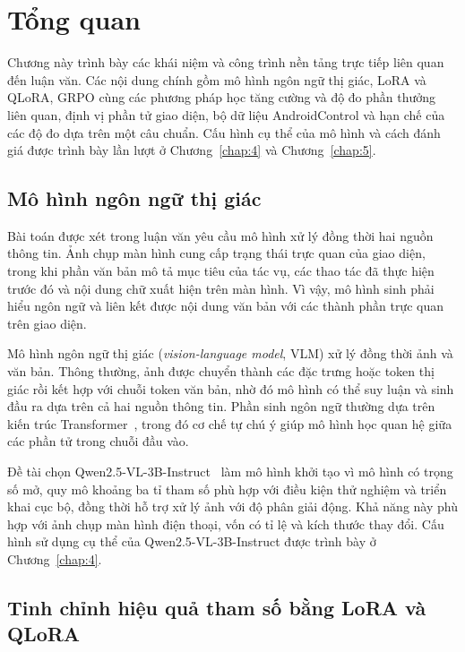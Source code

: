 \chapter{Tổng quan}
\label{chap:2}

Chương này trình bày các khái niệm và công trình nền tảng trực tiếp liên quan đến luận văn. Các nội dung chính gồm mô hình ngôn ngữ thị giác, LoRA và QLoRA, GRPO cùng các phương pháp học tăng cường và độ đo phần thưởng liên quan, định vị phần tử giao diện, bộ dữ liệu AndroidControl và hạn chế của các độ đo dựa trên một câu chuẩn. Cấu hình cụ thể của mô hình và cách đánh giá được trình bày lần lượt ở Chương~\ref{chap:4} và Chương~\ref{chap:5}.

\section{Mô hình ngôn ngữ thị giác}\label{sec:2.1}

Bài toán được xét trong luận văn yêu cầu mô hình xử lý đồng thời hai nguồn thông tin. Ảnh chụp màn hình cung cấp trạng thái trực quan của giao diện, trong khi phần văn bản mô tả mục tiêu của tác vụ, các thao tác đã thực hiện trước đó và nội dung chữ xuất hiện trên màn hình. Vì vậy, mô hình sinh phải hiểu ngôn ngữ và liên kết được nội dung văn bản với các thành phần trực quan trên giao diện.

Mô hình ngôn ngữ thị giác (\emph{vision-language model}, VLM) xử lý đồng thời ảnh và văn bản. Thông thường, ảnh được chuyển thành các đặc trưng hoặc token thị giác rồi kết hợp với chuỗi token văn bản, nhờ đó mô hình có thể suy luận và sinh đầu ra dựa trên cả hai nguồn thông tin. Phần sinh ngôn ngữ thường dựa trên kiến trúc Transformer~\cite{vaswani2017}, trong đó cơ chế tự chú ý giúp mô hình học quan hệ giữa các phần tử trong chuỗi đầu vào.

Đề tài chọn Qwen2.5-VL-3B-Instruct~\cite{qwen25vl} làm mô hình khởi tạo vì mô hình có trọng số mở, quy mô khoảng ba tỉ tham số phù hợp với điều kiện thử nghiệm và triển khai cục bộ, đồng thời hỗ trợ xử lý ảnh với độ phân giải động. Khả năng này phù hợp với ảnh chụp màn hình điện thoại, vốn có tỉ lệ và kích thước thay đổi. Cấu hình sử dụng cụ thể của Qwen2.5-VL-3B-Instruct được trình bày ở Chương~\ref{chap:4}.

\section{Tinh chỉnh hiệu quả tham số bằng LoRA và QLoRA}\label{sec:2.2}

